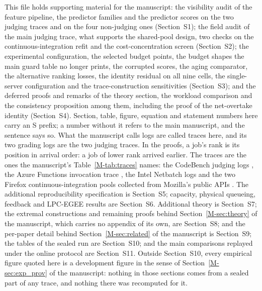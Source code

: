 \documentclass[mathematics,supfile,submit,moreauthors]{Definitions/mdpi}
\begin{document}
\maketitle

This file holds supporting material for the manuscript: the visibility audit of the
feature pipeline, the predictor families and the predictor scores on the two judging
traces and on the four non-judging ones (Section~S1); the field audit of the main
judging trace, what supports the shared-pool design, two checks on the
continuous-integration refit and the cost-concentration screen (Section~S2); the
experimental configuration, the selected budget points, the budget shapes the main guard
table no longer prints, the corrupted scores, the aging comparator, the alternative
ranking losses, the identity residual on all nine cells, the single-server configuration
and the trace-construction sensitivities (Section~S3); and the deferred proofs and
remarks of the theory section, the workload comparison and the consistency proposition
among them, including the proof of the net-overtake identity (Section~S4). Section,
table, figure, equation and statement numbers here carry an S prefix; a number without
it refers to the main manuscript, and the sentence says so. What the manuscript calls
logs are called traces here, and its two grading logs are the two judging traces. In the
proofs, a job's
rank is its position in arrival order: a job of lower rank arrived earlier. The traces are the ones the manuscript's Table~\ref*{M-tab:traces} names: the
CodeBench judging logs \cite{codebench_dataset}, the Azure Functions invocation trace
\cite{azure2021trace}, the Intel Netbatch logs \cite{netbatch2012trace} and the two
Firefox continuous-integration pools collected from Mozilla's public APIs
\cite{taskcluster_docs,treeherder_docs}. The additional reproducibility specification is Section~S5; capacity, physical
queueing, feedback and LPC-EGEE results are Section~S6. Additional theory is Section~S7;
the extremal constructions and remaining proofs behind Section~\ref*{M-sec:theory} of the manuscript,
which carries no appendix of its own, are Section~S8; and the per-paper detail behind
Section~\ref*{M-sec:related} of the manuscript is Section~S9; the tables of the sealed run are
Section~S10; and the main comparisons replayed under the online protocol are Section~S11.
Outside Section~S10, every empirical figure quoted here is a development figure in
the sense of Section~\ref*{M-sec:exp_prov} of the manuscript: nothing in those sections comes
from a sealed part of any trace, and nothing there was recomputed for it.
\end{document}
